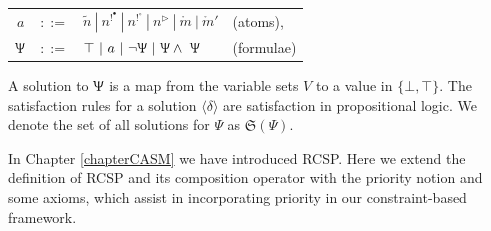 \vspace{.3cm}
\begin{tabular}{c c l l}
\centering
  $a $ & $::=$ & $ \tilde{n}\ |\ n^{!^\bullet}\ |\ n^{!^\circ}\ | \ n^\triangleright\ |\ \mathring{m}\ |\ \mathring{m}'$ & (atoms),\\ 
  $\Uppsi $ & $::=$ & $ \top \ | \ a\ |\ \neg \Uppsi \ | \ \Uppsi \wedge \ \Uppsi $ & (formulae) \\
\end{tabular}
\vspace{.3cm}

A solution to $\Uppsi$ is a map from the variable sets $V$ to a value in $\{\bot, \top\}$. The satisfaction rules for a solution $\langle \delta \rangle$ are satisfaction in propositional logic.
We denote the set of all solutions for $\Psi$ as $\mathfrak{S}(\Psi)$.

In Chapter \ref{chapterCASM} we have introduced RCSP. Here we extend the definition of RCSP and its composition operator with the priority notion and some axioms, which assist in incorporating priority in our constraint-based framework.

